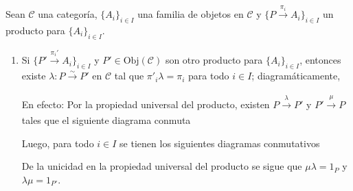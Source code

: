 \documentclass[tesis]{subfiles}
\begin{document}
\begin{Obs} \label{Observaciones del producto}
    Sean $\mathscr{C}$ una categoría, $\{A_i\}_{i\in I}$ una familia de objetos en $\mathscr{C}$ y $\{P\xrightarrow[]{\pi_i} A_i\}_{i\in I}$ un producto para $\{A_i\}_{i\in I}$.

    \begin{enumerate}[label=(\arabic*)]

        \item Si $\{P'\xrightarrow[]{\pi_i'} A_i\}_{i\in I}$ y $P'\in\text{Obj}(\mathscr{C})$ son otro producto para $\{A_i\}_{i\in I}$, entonces existe $\lambda:P\xrightarrow[]{\sim} P'$ en $\mathscr{C}$ tal que $\pi'_i\lambda=\pi_i$ para todo $i\in I$; diagramáticamente,
            \begin{center}
            \end{center}

            En efecto: Por la propiedad universal del producto, existen $P\xrightarrow[]{\lambda} P'$ y $P'\xrightarrow[]{\mu} P$ tales que el siguiente diagrama conmuta
            \begin{center}
            \end{center}

            Luego, para todo $i\in I$ se tienen los siguientes diagramas conmutativos
            \begin{center}
            \end{center}
            De la unicidad en la propiedad universal del producto se sigue que $\mu\lambda = 1_P$ y $\lambda\mu = 1_{P'}$.
            

\end{enumerate}
\end{Obs}
\end{document}
